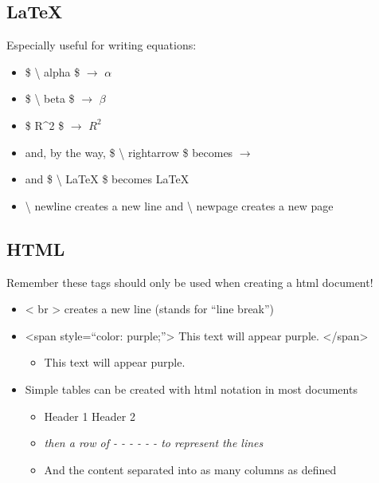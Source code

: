 \documentclass[
]{book}
\providecommand{\tightlist}{%
  \setlength{\itemsep}{0pt}\setlength{\parskip}{0pt}}
\begin{document}
\subsection{\texorpdfstring{\LaTeX}{}}\label{section}

Especially useful for writing equations:

\begin{itemize}
\tightlist
\item
  \$ \textbackslash{} alpha \$ \(\rightarrow\) \(\alpha\)
\item
  \$ \textbackslash{} beta \$ \(\rightarrow\) \(\beta\)
\item
  \$ R\^{}2 \$ \(\rightarrow\) \(R^2\)
\item
  and, by the way, \$ \textbackslash{} rightarrow \$ becomes \(\rightarrow\)
\item
  and \$ \textbackslash{} LaTeX \$ becomes \LaTeX
\item
  \textbackslash{} newline creates a new line and \textbackslash{} newpage creates a new page
\end{itemize}

\subsection{HTML}\label{html}

Remember these tags should only be used when creating a html document!

\begin{itemize}
\tightlist
\item
  \textless{} br \textgreater{} creates a new line (stands for ``line break'')
\item
  \textless span style=``color: purple;''\textgreater{} This text will appear purple. \textless/span\textgreater{}

  \begin{itemize}
  \tightlist
  \item
    { This text will appear purple. }
  \end{itemize}
\item
  Simple tables can be created with html notation in most documents

  \begin{itemize}
  \tightlist
  \item
    Header 1 \textbar{} Header 2
  \item
    \emph{then a row of - - - \textbar{} - - - to represent the lines}
  \item
    And the content separated \textbar{} into as many columns as defined
  \end{itemize}
\end{itemize}
\end{document}
